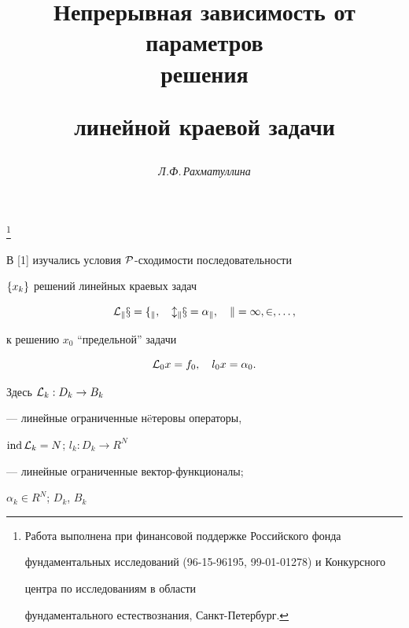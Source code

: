 \author{\it Л.Ф.\,Рахматуллина}




\title{Непрерывная зависимость от параметров\\ решения


линейной краевой задачи}


\thanks{Работа выполнена при финансовой поддержке Российского фонда


фундаментальных исследований (96-15-96195, 99-01-01278) и Конкурсного


центра по исследованиям в области


фундаментального естествознания, Санкт-Петербург.}





\date{}




\pagestyle{plain} %







\maketitle


\label{begin}








В [1] изучались условия $\cal P$-сходимости последовательности


$\{x_k\}$ решений линейных краевых задач


$$


\lkxfk,\quad \lkxak,\quad \kodi,


$$


к решению $x_0$ ``предельной'' задачи


$$


{\cal L}_0x=f_0,\quad l_0x=\alpha_0.


$$


Здесь ${\cal L}_k:D_k\to B_k$


--- линейные ограниченные н\"eтеровы операторы,


$\operatorname{ind}{\cal L}_k=N$; $l_k:D_k\to R^N$


--- линейные ограниченные вектор-функционалы;


$\alpha_k\in{R}^N$; $D_k$, $B_k$


